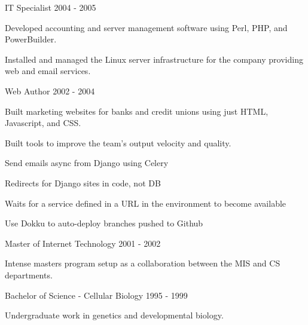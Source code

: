 \documentclass[11pt]{article} %
\begin{document}
\begin{description}
           {IT Specialist}
           {2004 - 2005}

\item Developed accounting and server management software using Perl, PHP, and PowerBuilder.

\item Installed and managed the Linux server infrastructure for the company providing web and email services.

           {Web Author}
           {2002 - 2004}

\item Built marketing websites for banks and credit unions using just HTML, Javascript, and CSS.

\item Built tools to improve the team's output velocity and quality.

\end{description}


        {}
        {Send emails async from Django using Celery}

        {}
        {Redirects for Django sites in code, not DB}

        {}
        {Waits for a service defined in a URL in the environment to become available}

        {}
        {Use Dokku to auto-deploy branches pushed to Github}


\begin{description}
\squish
{}
           {Master of Internet Technology}
           {2001 - 2002}

Intense masters program setup as a collaboration between the MIS  and CS departments.

           {Bachelor of Science - Cellular Biology}
           {1995 - 1999}

Undergraduate work in genetics and developmental biology.

\end{description}

%
%
%
%
%
\end{document}
